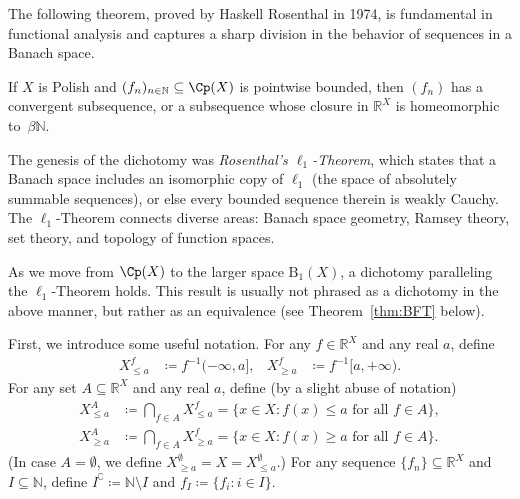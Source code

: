 The following theorem, proved by Haskell Rosenthal in 1974, is fundamental in functional analysis and captures a sharp division in the behavior of sequences in a Banach space.

\begin{theorem}
\label{thm:Rosenthal}
    If $X$ is Polish and $(f_n)_{n\in\mathbb{N}}\subseteq \Cp(X)$ is pointwise bounded, then $(f_n)$ has a convergent subsequence, or a subsequence whose closure in $\mathbb{R}^X$ is homeomorphic to~$\beta\mathbb{N}$.
\end{theorem}

The genesis of the dichotomy was \emph{Rosenthal's $\ell_1$-Theorem}, which states that a Banach space includes an isomorphic copy of $\ell_1$ (the space of absolutely summable sequences), or else every bounded sequence therein is weakly Cauchy.
The $\ell_1$-Theorem connects diverse areas:
Banach space geometry, Ramsey theory, set theory, and topology of function spaces.

As we move from $\Cp(X)$ to the larger space $\mathrm{B}_1(X)$, a dichotomy paralleling the $\ell_1$-Theorem holds.
This result is usually not phrased as a dichotomy in the above manner, but rather as an equivalence (see Theorem~\ref{thm:BFT} below).

First, we introduce some useful notation.
For any $f\in \mathbb{R}^X$ and any real $a$, define
\begin{align*}
    X^f_{\le a} &\coloneqq f^{-1}(-\infty,a], &
    X^f_{\ge a} &\coloneqq f^{-1}[a, +\infty).
\end{align*}
For any set $A\subseteq \mathbb{R}^X$ and any real $a$, define (by a slight abuse of notation)
\begin{align*}
    X^A_{\le a} &\coloneqq \bigcap_{f\in A}X^f_{\le a} = \{x\in X: \text{$f(x)\le a$ for all $f\in A$}\},\\
    X^A_{\ge a} &\coloneqq \bigcap_{f\in A}X^f_{\ge a} = \{x\in X: \text{$f(x)\ge a$ for all $f\in A$}\}.
\end{align*}
(In case $A=\emptyset$, we define $X^\emptyset_{\ge a} = X = X^\emptyset_{\le a}$.)
For any sequence $\{f_n\}\subseteq \mathbb{R}^X$ and $I\subseteq \mathbb{N}$, define $I^{\complement} \coloneqq \mathbb{N}\setminus I$ and $f_I \coloneqq \{f_i: i\in I\}$.


